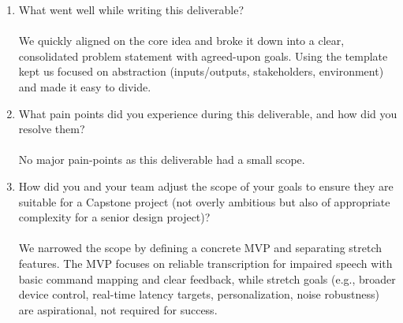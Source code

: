 \documentclass{article}
\begin{document}
\begin{enumerate}
    \item What went well while writing this deliverable? \\ \\
    We quickly aligned on the core idea and broke it down into a clear, consolidated problem statement with agreed-upon goals. Using the template kept us focused on abstraction (inputs/outputs, stakeholders, environment) and made it easy to divide.
    \item What pain points did you experience during this deliverable, and how
    did you resolve them? \\ \\
    No major pain-points as this deliverable had a small scope.
    \item How did you and your team adjust the scope of your goals to ensure
    they are suitable for a Capstone project (not overly ambitious but also of
    appropriate complexity for a senior design project)? \\ \\
    We narrowed the scope by defining a concrete MVP and separating stretch features. The MVP focuses on reliable transcription for impaired speech with basic command mapping and clear feedback, while stretch goals (e.g., broader device control, real-time latency targets, personalization, noise robustness) are aspirational, not required for success.
\end{enumerate}  
\end{document}

